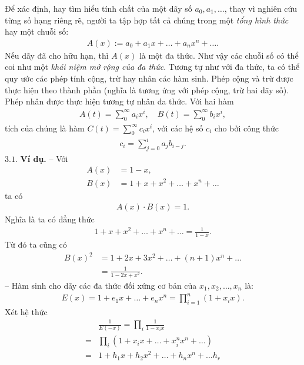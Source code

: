 \begin{multicols}{2}
	\vskip 0.1cm
	Để xác định, hay tìm hiểu tính chất của một dãy số $a_0,a_1,\ldots$, thay vì nghiên cứu từng số hạng riêng rẽ, người ta tập hợp tất cả chúng trong một {\color{blue} \em tổng hình thức} hay một chuỗi số:
	\begin{align*}
		A(x):=a_0+a_1 x+\ldots+ a_nx^n+\ldots.
	\end{align*}
	Nếu dãy đã cho hữu hạn, thì $A(x)$ là một đa thức. Như vậy các chuỗi số có thể coi như một \textit{\color{blue} khái niệm mở rộng của đa thức}.
	\vskip 0.1cm
	Tương tự như với đa thức, ta có thể quy ước các phép tính cộng, trừ hay nhân các hàm sinh.   
	\vskip 0.1cm
	Phép cộng và trừ được thực hiện theo thành phần (nghĩa là tương ứng với phép cộng, trừ hai dãy số).
	\vskip 0.1cm
	Phép nhân được thực hiện tương tự nhân đa thức. Với hai hàm
	\begin{align*}
		A(t)=\sum_0^\infty a_ix^i,\quad B(t)=\sum_0^\infty b_i x^i,
	\end{align*}
	tích của chúng là hàm $C(t)=\sum_0^\infty c_ix^i$, với các hệ số $c_i$ cho bởi công thức
	\begin{align*}
		c_i=\sum_{j=0}^i a_jb_{i-j}.
	\end{align*}
	$\pmb{3.1.}$ \textbf{\color{hoccungpi}Ví dụ.}
	\vskip 0.1cm
	-- Với
	\begin{align*}
		A(x)&=1-x,\\
		B(x)&=1+x+x^2+\ldots+x^n+\ldots
	\end{align*}
	ta có 
	\begin{align*}
		A(x)\cdot B(x)=1.
	\end{align*}
	Nghĩa là ta có đẳng thức
	\begin{align*}
		1+x+x^2+\ldots+x^n+\ldots=\frac 1{1-x}.
	\end{align*}
	Từ đó ta cũng có
	\begin{align*}
		B(x)^2&=1+2x+3x^2+\ldots+(n+1)x^n+\ldots\\
		&=\frac1{1-2x+x^2}.
	\end{align*}
	-- Hàm sinh cho dãy  các đa thức đối xứng cơ bản của $x_1,x_2,\ldots,x_n$ là: 
	\begin{align*}
		E(x)=1+e_1x+\ldots +e_nx^n=\prod_{i=1}^n (1+x_ix).
	\end{align*}   
	Xét hệ thức
	\begin{align*}
		&\frac 1{E(-x)}=\prod_i \frac 1{1-x_ix}\\
		=&\prod_i (1+x_i x+\ldots+x_i^nx^n+\ldots)\nonumber \\
		=& 1+h_1x+h_2x^2+\ldots+h_nx^n+\ldots h_r\\

\end{align*}
\end{multicols}
